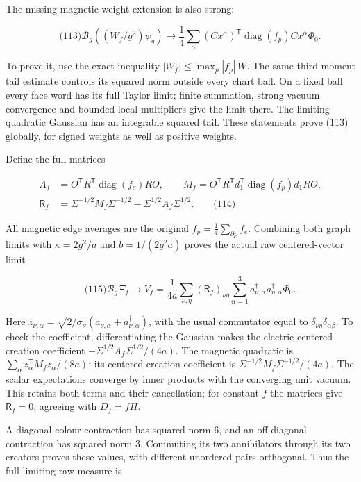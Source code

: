The missing magnetic-weight extension is also strong:

\[
\qquad\text{(113)}
 \mathcal B_g((W_f/g^2)\psi_g)
 \longrightarrow \frac14\sum_\alpha
 (Cx^\alpha)^{\mathsf T}\operatorname{diag}(f_p)Cx^\alpha\Phi_0.
\]

To prove it, use the exact inequality \(|W_f|\le\max_p|f_p|\,W\). The
same third-moment tail estimate controls its squared norm outside every
chart ball. On a fixed ball every face word has its full Taylor limit;
finite summation, strong vacuum convergence and bounded local
multipliers give the limit there. The limiting quadratic Gaussian has an
integrable squared tail. These statements prove (113) globally, for
signed weights as well as positive weights.

Define the full matrices

\[
\begin{aligned}
 A_f&=O^{\mathsf T}R^{\mathsf T}\operatorname{diag}(f_e)RO,
 \qquad
 M_f=O^{\mathsf T}R^{\mathsf T}d_1^{\mathsf T}
                  \operatorname{diag}(f_p)d_1RO, \\
 \mathsf R_f&=\Sigma^{-1/2}M_f\Sigma^{-1/2}
                   -\Sigma^{1/2}A_f\Sigma^{1/2}. \qquad\text{(114)}
\end{aligned}
\]

All magnetic edge averages are the original
\(f_p=\frac14\sum_{\partial p}f_e\). Combining both graph limits with
\(\kappa=2g^2/a\) and \(b=1/(2g^2a)\) proves the actual raw
centered-vector limit

\[
\qquad\text{(115)}
 \mathcal B_g\Xi_f\longrightarrow
 V_f=\frac1{4a}\sum_{\nu,\eta}(\mathsf R_f)_{\nu\eta}
       \sum_{\alpha=1}^3
       a_{\nu,\alpha}^\dagger a_{\eta,\alpha}^\dagger\Phi_0 .
\]

Here \(z_{\nu,\alpha}=\sqrt{2/\sigma_\nu}
(a_{\nu,\alpha}+a_{\nu,\alpha}^\dagger)\), with the usual commutator
equal to \(\delta_{\nu\eta}\delta_{\alpha\beta}\). To check the
coefficient, differentiating the Gaussian makes the electric centered
creation coefficient \(-\Sigma^{1/2}A_f\Sigma^{1/2}/(4a)\). The magnetic
quadratic is \(\sum_\alpha z_\alpha^{\mathsf T}M_fz_\alpha/(8a)\); its
centered creation coefficient is \(\Sigma^{-1/2}M_f\Sigma^{-1/2}/(4a)\).
The scalar expectations converge by inner products with the converging
unit vacuum. This retains both terms and their cancellation; for
constant \(f\) the matrices give \(\mathsf R_f=0\), agreeing with
\(D_f=fH\).

A diagonal colour contraction has squared norm \(6\), and an
off-diagonal contraction has squared norm \(3\). Commuting its two
annihilators through its two creators proves these values, with
different unordered pairs orthogonal. Thus the full limiting raw measure
is

